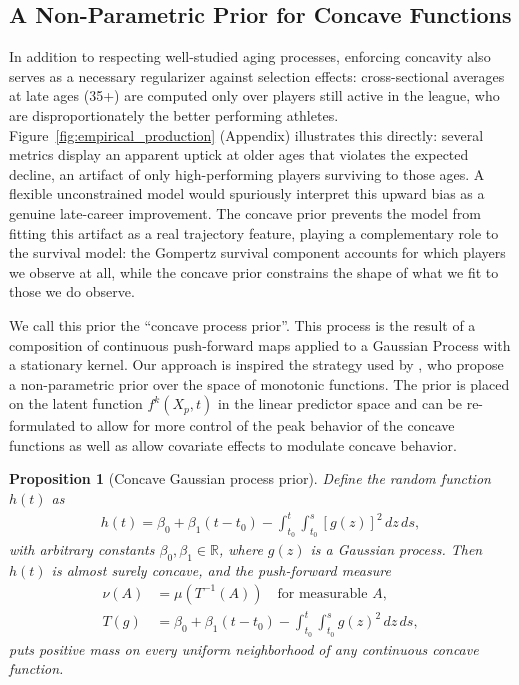 \documentclass[aoas]{imsart}
\newtheorem{proposition}{Proposition}
\begin{document}
\subsection{A Non-Parametric Prior for Concave Functions}
\label{sec:concave_prior}
 In addition to respecting well-studied aging processes, enforcing concavity also serves as a necessary regularizer against selection effects: cross-sectional averages at late ages (35+) are computed only over players still active in the league, who are disproportionately the better performing athletes.  Figure~\ref{fig:empirical_production} (Appendix) illustrates this directly: several metrics display an apparent uptick at older ages that violates the expected decline, an artifact of only high-performing players surviving to those ages.  A flexible unconstrained model would spuriously interpret this upward bias as a genuine late-career improvement.  The concave prior prevents the model from fitting this artifact as a real trajectory feature, playing a complementary role to the survival model: the Gompertz survival component accounts for which players we observe at all, while the concave prior constrains the shape of what we fit to those we do observe. 
 
We call this prior the ``concave process prior''. This process is the result of a composition of continuous push-forward maps applied to a Gaussian Process with a stationary kernel. Our approach is inspired the strategy used by \cite{convexityconstraints}, who propose a non-parametric prior over the space of monotonic functions.
The prior is placed on the latent function $f^k(X_p,t)$ in the linear predictor space and can be re-formulated to allow for more control of the peak behavior of the concave functions as well as allow covariate effects to modulate concave behavior. 


\begin{proposition}[Concave Gaussian process prior]
Define the random function $h(t)$ as 
\begin{align}
    h(t) = \beta_0 + \beta_1 (t-t_0) - \int_{t_0}^t \int_{t_0}^s [g(z)]^2 \, dz \, ds,
    \label{eqn:concave_process_uni}
\end{align}
with arbitrary constants $\beta_0, \beta_1 \in \mathbb{R}$, where $g(z)$ is a Gaussian process.
Then $h(t)$ is almost surely concave, and the push-forward measure
\begin{align*}
\nu(A) &= \mu(T^{-1}(A)) \quad \text{for measurable } A, \\
T(g) &= \beta_0 + \beta_1 (t-t_0) - \int_{t_0}^t \int_{t_0}^s g(z)^2\, dz\, ds,
\end{align*}
puts positive mass on every uniform neighborhood of any continuous concave function.
\end{proposition}
\end{document}
